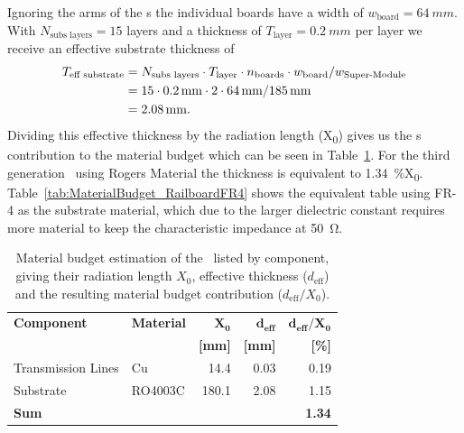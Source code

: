 \documentclass[../BTOF_summary.tex]{subfiles}
\begin{document}
Ignoring the arms of the \railboard s the individual boards have a width of $w_\text{board} = \SI{64}{mm}$.
With $N_\text{subs layers} = 15$ layers and a thickness of $T_\text{layer} = \SI{0.2}{mm}$ per layer we receive an effective substrate thickness of
\begin{align}
	T_\text{eff substrate} &= N_\text{subs layers} \cdot T_\text{layer} \cdot n_\text{boards} \cdot w_\text{board} / w_\text{Super-Module} \\
	&= 15 \cdot \SI{0.2}{mm} \cdot 2 \cdot \SI{64}{mm} / \SI{185}{mm} \\
	&= \SI{2.08}{mm} . 
\end{align}
Dividing this effective thickness by the radiation length (X\textsubscript{0}) gives us the \railboard s contribution to the material budget which can be seen in Table~\ref{tab:MaterialBudget_Railboard}.
For the third generation \railboard\ using Rogers Material the thickness is equivalent to \SI{1.34}{\percent}X\textsubscript{0}.
Table~\ref{tab:MaterialBudget_RailboardFR4} shows the equivalent table using FR-4 as the substrate material, which due to the larger dielectric constant requires more material to keep the characteristic impedance at \SI{50}{\ohm}.

\begin{table}[htbp]
\centering
\caption[Material budget estimation of the \railboard .]{Material budget estimation of the \railboard\ listed by component, giving their radiation length $X_0$, effective thickness ($d_\text{eff}$) and the resulting material budget contribution ($d_{\text{eff}} / X_0$).}
\label{tab:MaterialBudget_Railboard}
\begin{tabular}{@{}llrrr@{}}
\toprule
\textbf{Component} & \textbf{Material} & $\mathbf{X_0}$ & $\mathbf{d_{eff}}$ & $\mathbf{d_{eff}/X_{0}}$ \\
                   & \textbf{}         & \textbf{[mm]}  & \textbf{[mm]}      & \textbf{[\%]}            \\ \midrule
Transmission Lines & Cu      & 14.4   & 0.03  & 0.19      \\
Substrate          & RO4003C & 180.1  & 2.08  & 1.15      \\ \midrule
\textbf{Sum}       &				      &                &                    & \textbf{1.34}            \\ \bottomrule
\end{tabular}
\end{table}
\end{document}
